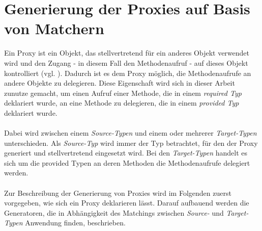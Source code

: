 \section{Generierung der Proxies auf Basis von Matchern}\label{sec_proxygen}
Ein Proxy ist ein Objekt, das stellvertretend für ein anderes Objekt verwendet wird und den Zugang - in diesem Fall den Methodenaufruf - auf dieses Objekt kontrolliert (vgl. \cite{patterns}). Dadurch ist es dem Proxy möglich, die Methodenaufrufe an andere Objekte zu delegieren. Diese Eigenschaft wird sich in dieser Arbeit zunutze gemacht, um einen Aufruf einer Methode, die in einem \emph{required Typ} deklariert wurde, an eine Methode zu delegieren, die in einem \emph{provided Typ} deklariert wurde.
\\\\
Dabei wird zwischen einem \emph{Source-Typen} und einem oder mehrerer \emph{Target-Typen} unterschieden. Als \emph{Source-Typ} wird immer der Typ betrachtet, für den der Proxy generiert und stellvertretend eingesetzt wird. Bei den \emph{Target-Typen} handelt es sich um die provided Typen an deren Methoden die Methodenaufrufe delegiert werden.
\\\\
Zur Beschreibung der Generierung von Proxies wird im Folgenden zuerst vorgegeben, wie sich ein Proxy deklarieren lässt. Darauf aufbauend werden die Generatoren, die in Abhängigkeit des Matchings zwischen \emph{Source-} und \emph{Target-Typen} Anwendung finden, beschrieben.
